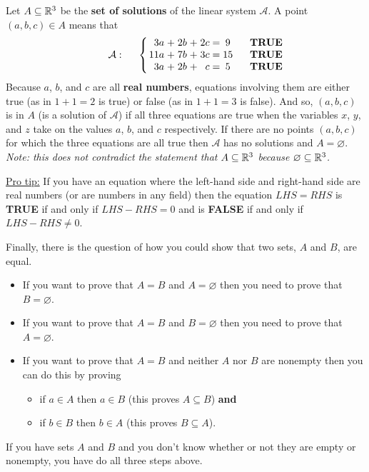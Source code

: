 \documentclass[10pt,addpoints,answers]{exam}
\begin{document}
\begin{questions}
Let $A \subseteq \mathbb{R}^3$ be the \textbf{set of solutions} of the linear system
$\mathcal{A}$.  A point $(a,b,c) \in A$ means that
$$
\hspace{.8cm} \mathcal{A}: \hspace{.5cm} \left\{ \arraycolsep=1.4pt
	\begin{array}{rcrcrccrl}
          3a &+&2b &+&2c &= &9  &\hspace{.5cm} \mbox{\textbf{TRUE}}\\
          11a &+&7b &+&3c &=& 15 & \mbox{\textbf{TRUE}}\\
          3a &+&2b &+&c &=& 5 & \mbox{\textbf{TRUE}}
	\end{array} \right.
$$
Because $a$, $b$, and $c$ are all \textbf{real numbers}, equations involving
them are either true (as in $1+1=2$ is true) or false (as in $1+1=3$ is false).
And so, $(a,b,c)$ is in $A$ (is a solution of $\mathcal{A}$) if all three
equations are true when the variables $x$, $y$, and $z$ take on the values $a$,
$b$, and $c$ respectively.  If there are no points $(a,b,c)$ for which the three
equations are all true then $\mathcal{A}$ has no solutions and
$A = \varnothing$.  \textit{Note: this does not contradict the statement that
  $A \subseteq \mathbb{R}^3$ because $\varnothing \subseteq \mathbb{R}^3$.}

\underline{Pro tip:} If you have an equation where the left-hand side and
right-hand side are real numbers (or are numbers in any field) then the equation
$LHS = RHS$ is \textbf{TRUE} if and only if $LHS-RHS = 0$ and is \textbf{FALSE}
if and only if $LHS-RHS \neq 0$.

Finally, there is the question of how you could show that two sets, $A$ and $B$,
are equal.
\begin{itemize}
\item If you want to prove that $A = B$ and $A = \varnothing$ then you need to
  prove that $B = \varnothing$.  %
\item If you want to prove that $A = B$ and $B = \varnothing$ then you need to
  prove that $A = \varnothing$.  %
\item If you want to prove that $A = B$ and neither $A$ nor $B$ are nonempty
  then you can do this by proving
  \begin{itemize}
  \item if $a \in A$ then $a \in B$ (this proves $A \subseteq B$) \textbf{and}
  \item if $b \in B$ then $b \in A$ (this proves $B \subseteq A$).
  \end{itemize}
\end{itemize} If you have sets $A$ and $B$ and you don't know whether or not
they are empty or nonempty, you have do all three steps above.


\end{questions}
\end{document}

